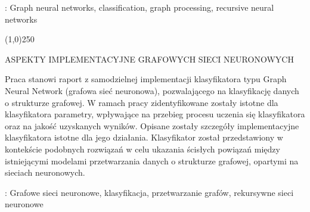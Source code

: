 \begin{titlepage}
    : {Graph neural networks, classification, graph processing, recursive neural networks}
    \par
    \vspace{4\baselineskip}

	\begin{center}
	\line(1,0){250}
	\end{center}

    \begin{center}
	{\large \MakeUppercase{ASPEKTY IMPLEMENTACYJNE GRAFOWYCH SIECI NEURONOWYCH}}\par\bigskip
    \end{center}
    {\noindent
	Praca stanowi raport z samodzielnej implementacji klasyfikatora typu Graph Neural Network (grafowa sieć neuronowa), pozwalającego na klasyfikację danych o strukturze grafowej. W ramach pracy zidentyfikowane zostały istotne dla klasyfikatora parametry, wpływające na przebieg procesu uczenia się klasyfikatora oraz na jakość uzyskanych wyników. Opisane zostały szczegóły implementacyjne klasyfikatora istotne dla jego działania. Klasyfikator został przedstawiony w kontekście podobnych rozwiązań w celu ukazania ścisłych powiązań między istniejącymi modelami przetwarzania danych o strukturze grafowej, opartymi na sieciach neuronowych.
	}
	
    \vspace*{1\baselineskip}

    : {Grafowe sieci neuronowe, klasyfikacja, przetwarzanie grafów, rekursywne sieci neuronowe}

\end{titlepage}

